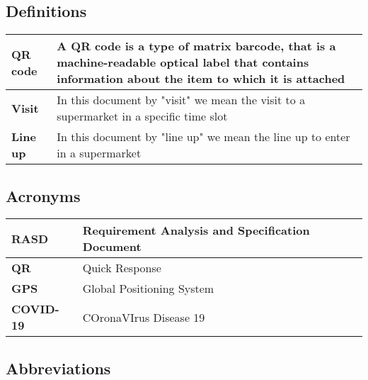 \subsection{Definitions}

    \begin{center}
        {\renewcommand{\arraystretch}{2}%
        \begin{tabular}{L{2cm}L{12cm}}
            \hline
            \textbf{QR code} & A QR code is a type of matrix barcode, that is a machine-readable optical label that 
            contains information about the item to which it is attached \\
            \hline
            \textbf{Visit} & In this document by "visit" we mean the visit to a supermarket in a specific time slot \\
            \hline
            \textbf{Line up} & In this document by "line up" we mean the line up to enter in a supermarket \\
            \hline
        \end{tabular}}
    \end{center}
    

\subsection{Acronyms}

    \begin{center}
        {\renewcommand{\arraystretch}{2}%
        \begin{tabular}{L{2cm}L{12cm}}
            \hline
            \textbf{RASD} & Requirement Analysis and Specification Document \\
            \hline
            \textbf{QR} & Quick Response \\
            \hline
            \textbf{GPS} & Global Positioning System \\
            \hline
            \textbf{COVID-19} & COronaVIrus Disease 19 \\
            \hline
        \end{tabular}}
    \end{center}

\subsection{Abbreviations}

